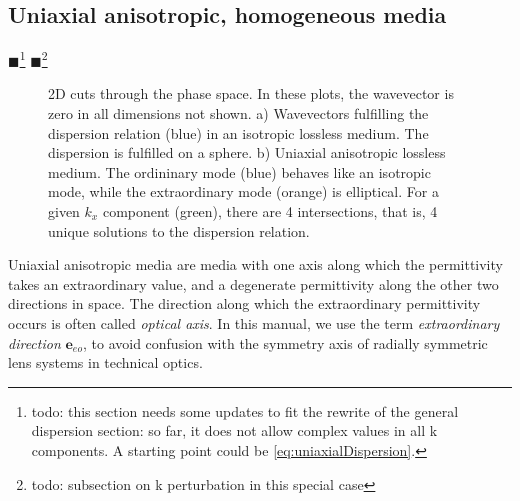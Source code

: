 \documentclass[12pt,a4paper,twoside,openright,BCOR10mm,headsepline,titlepage,abstracton,chapterprefix,final]{scrreprt}
\newcommand\Vector[1]{{\mathbf{#1}}}
\newcommand\wavenumber{k}
\newcommand{\remark}[1]{{\color{red}$\blacksquare$}\footnote{{\color{red}#1}}}
\begin{document}
\subsection{Uniaxial anisotropic, homogeneous media}
\remark{todo: this section needs some updates to fit the rewrite of the general dispersion section: so far, it does not allow complex values in all k components. A starting point could be \ref{eq:uniaxialDispersion}.}
\remark{todo: subsection on k perturbation in this special case}
\begin{figure}
  \centering
  \caption{2D cuts through the phase space.
           In these plots, the wavevector is zero in all dimensions not shown.
           a) Wavevectors fulfilling the dispersion relation (blue) in an isotropic lossless medium. The dispersion is fulfilled on a sphere.
           b) Uniaxial anisotropic lossless medium. 
              The ordininary mode (blue) behaves like an isotropic mode, 
              while the extraordinary mode (orange) is elliptical.
              For a given $\wavenumber_x$ component (green),
              there are 4 intersections, that is, 4 unique solutions to the dispersion relation.}
  \label{fig:disperion_isotropic_and_uniaxial}
\end{figure}
Uniaxial anisotropic media are media with one axis along which the permittivity takes an extraordinary value, 
and a degenerate permittivity along the other two directions in space.
The direction along which the extraordinary permittivity occurs is often called \emph{optical axis}. 
In this manual, we use the term \emph{extraordinary direction} $\Vector{e}_{eo}$, to avoid confusion with the symmetry axis of radially symmetric lens systems in technical optics.
\end{document}
